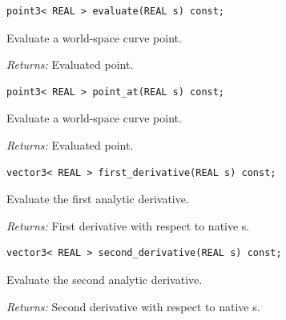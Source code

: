 \par\noindent\begin{minipage}{\linewidth}
\begin{lstlisting}[style=apireference]
point3< REAL > evaluate(REAL s) const;
\end{lstlisting}
{\footnotesize Evaluate a world-space curve point.\par}
{\footnotesize\textit{Returns:} Evaluated point.\par}
\end{minipage}\par\vspace{1pt}
\par\noindent\begin{minipage}{\linewidth}
\begin{lstlisting}[style=apireference]
point3< REAL > point_at(REAL s) const;
\end{lstlisting}
{\footnotesize Evaluate a world-space curve point.\par}
{\footnotesize\textit{Returns:} Evaluated point.\par}
\end{minipage}\par\vspace{1pt}
\par\noindent\begin{minipage}{\linewidth}
\begin{lstlisting}[style=apireference]
vector3< REAL > first_derivative(REAL s) const;
\end{lstlisting}
{\footnotesize Evaluate the first analytic derivative.\par}
{\footnotesize\textit{Returns:} First derivative with respect to native s.\par}
\end{minipage}\par\vspace{1pt}
\par\noindent\begin{minipage}{\linewidth}
\begin{lstlisting}[style=apireference]
vector3< REAL > second_derivative(REAL s) const;
\end{lstlisting}
{\footnotesize Evaluate the second analytic derivative.\par}
{\footnotesize\textit{Returns:} Second derivative with respect to native s.\par}
\end{minipage}\par\vspace{1pt}
